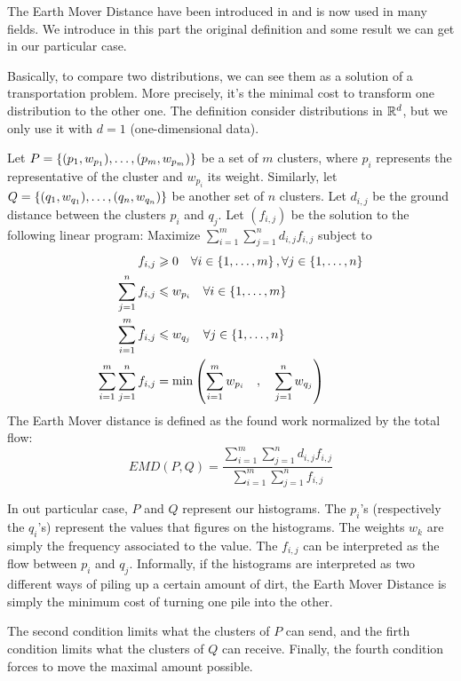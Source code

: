 The Earth Mover Distance have been introduced in \cite{EMD-def} and is now used in many fields. We introduce in this part the original definition and some result we can get in our particular case.

Basically, to compare two distributions, we can see them as a solution of a transportation problem. More precisely, it's the minimal cost to transform one distribution to the other one. The definition consider distributions in $\mathbb{R}^d$, but we only use it with $d=1$ (one-dimensional data).

\begin{definition}
	Let $P = \left\{ (p_1,w_{p_1}), \dots, (p_m,w_{p_m}) \right\}$ be a set of $m$ clusters, where $p_i$ represents the representative of the cluster and $w_{p_i}$ its weight. Similarly, let $Q = \left\{ (q_1,w_{q_1}), \dots, (q_n,w_{q_n}) \right\}$ be another set of $n$ clusters. Let $d_{i,j}$ be the ground distance between the clusters $p_i$ and $q_j$.
	Let $(f_{i,j})$ be the solution to the following linear program:
	Maximize $\sum_{i=1}^m \sum_{j=1}^n d_{i,j} f_{i,j}$ subject to
\[
    \begin{aligned}
        f_{i,j} &\geqslant 0  \quad \forall i \in \left\{ 1, \dots, m \right\}, \forall j \in \left\{ 1, \dots, n \right\} \\
        \sum_{j=1}^{n}{f_{i,j}} &\leqslant w_{p_i} \quad \forall i \in \left\{ 1, \dots, m \right\}\\
        \sum_{i=1}^{m}{f_{i,j}} &\leqslant w_{q_j} \quad \forall j \in \left\{ 1, \dots, n \right\} \\
        \sum_{i=1}^m \sum_{j=1}^n f_{i,j} &= \operatorname{min} \left( \sum_{i=1}^m w_{p_i} \quad,\quad \sum_{j=1}^n w_{q_j}\right)
    \end{aligned}
\]
The Earth Mover distance is defined as the found work normalized by the total flow:
\[
	EMD(P,Q) = \frac{\sum_{i=1}^m \sum_{j=1}^n d_{i,j} f_{i,j}}{\sum_{i=1}^m \sum_{j=1}^n f_{i,j}}
\]
\end{definition}

In out particular case, $P$ and $Q$ represent our histograms. The $p_i$'s (respectively the $q_i$'s) represent the values that figures on the histograms. The weights $w_k$ are simply the frequency associated to the value. The $f_{i,j}$ can be interpreted as the flow between $p_i$ and $q_j$. Informally, if the histograms are interpreted as two different ways of piling up a certain amount of dirt, the Earth Mover Distance is simply the minimum cost of turning one pile into the other.

The second condition limits what the clusters of $P$ can send, and the firth condition limits what the clusters of $Q$ can receive. Finally, the fourth condition forces to move the maximal amount possible.

